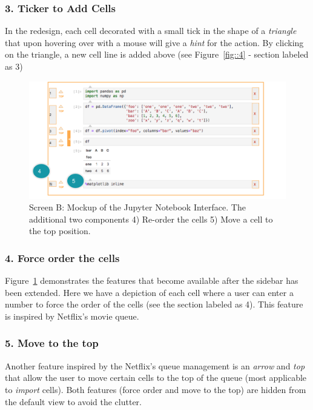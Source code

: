 \documentclass[12pt,letterpaper]{article}
\begin{document}
\subsubsection*{3. Ticker to Add Cells}
In the redesign, each cell decorated with a small tick in the shape of a \textit{triangle} that upon hovering over with a mouse will give a \textit{hint} for the action. By clicking on the triangle, a new cell line is added above (see Figure~\ref{fig::4} - section labeled as 3)

\begin{figure}[hbt!]
\centering
\includegraphics[scale=.5]{figures/project-principles/jupyter_mock_screen_b.png}
\caption{Screen B: Mockup of the Jupyter Notebook Interface. The additional two components 4) Re-order the cells 5) Move a cell to the top position.}
\label{fig::5}
\end{figure}

\subsubsection*{4. Force order the cells}
Figure~\ref{fig::5} demonstrates the features that become available after the sidebar has been extended. Here we have a depiction of each cell where a user can enter a number to force the order of the cells (see the section labeled as 4). This feature is inspired by Netflix's movie queue. 

\subsubsection*{5. Move to the top}
Another feature inspired by the Netflix's queue management is an \textit{arrow} and \textit{top} that allow the user to move certain cells to the top of the queue (most applicable to \textit{import} cells). Both features (force order and move to the top) are hidden from the default view to avoid the clutter.
\end{document}
